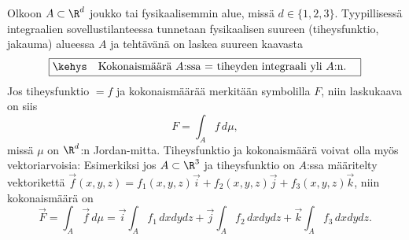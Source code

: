 Olkoon $A\subset\R^d$ joukko tai fysikaalisemmin alue, missä $d\in\{1,2,3\}$. Tyypillisessä
integraalien sovellustilanteessa tunnetaan fysikaalisen suureen  
(tiheysfunktio, jakauma) alueessa $A$ ja tehtävänä on laskea suureen 
kaavasta %
\[
\boxed{\kehys\quad \text{Kokonaismäärä $A$:ssa = tiheyden integraali yli $A$:n.} \quad}
\]
Jos tiheysfunktio $=f$ ja kokonaismäärää merkitään symbolilla $F$, niin laskukaava on siis
\[
F=\int_A f\,d\mu,
\]
missä $\mu$ on $\R^d$:n Jordan-mitta. Tiheysfunktio ja kokonaismäärä voivat olla myös
vektoriarvoisia: Esimerkiksi jos $A\subset\R^3$ ja tiheysfunktio on $A$:ssa määritelty
vektorikettä $\vec f(x,y,z)=f_1(x,y,z)\vec i+f_2(x,y,z)\vec j+f_3(x,y,z)\vec k$, niin 
kokonaismäärä on
\[ 
\vec F=\int_A \vec f\,d\mu=\vec i\int_A f_1\,dxdydz+\vec j\int_A f_2\,dxdydz
                                                   +\vec k\int_A f_3\,dxdydz.
\]

